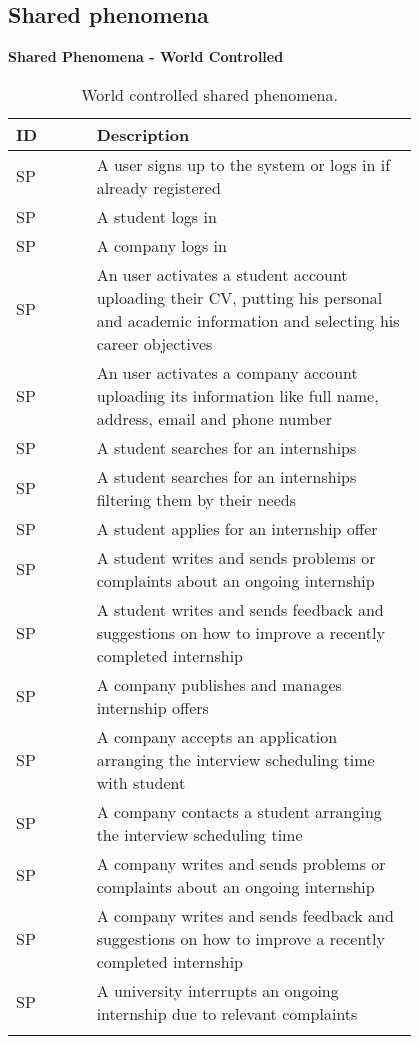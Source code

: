 \clearpage

\subsection{Shared phenomena}
\label{subsec:shared_phenomena}%
\setcounter{sp}{1}
\newcommand{\csp} {\thesp\stepcounter{sp}}
\begin{center}
\renewcommand{\arraystretch}{2}

\textbf{Shared Phenomena - World Controlled}

\begin{longtable}{ l p{0.8\linewidth} }
    \hline
    \textbf{ID} & \textbf{Description} \\ 
    \hline
    SP\csp & A user signs up to the system or logs in if already registered \\ 
    \hline
    SP\csp & A student logs in \\ 
    \hline
    SP\csp & A company logs in \\ 
    \hline
    SP\csp & An user activates a student account uploading their CV, putting his personal and academic information and selecting his career objectives \\ 
    \hline
    SP\csp & An user activates a company account uploading its information like full name, address, email and phone number \\ 
    \hline
    SP\csp & A student searches for an internships \\
    \hline
    SP\csp & A student searches for an internships filtering them by their needs \\ 
    \hline
    SP\csp & A student applies for an internship offer \\ 
    \hline
    SP\csp & A student writes and sends problems or complaints about an ongoing internship \\ 
    \hline
    SP\csp & A student writes and sends feedback and suggestions on how to improve a recently completed internship \\ 
    \hline
    SP\csp & A company publishes and manages internship offers \\ 
    \hline
    SP\csp & A company accepts an application arranging the interview scheduling time with student \\ 
    \hline
    SP\csp & A company contacts a student arranging the interview scheduling time \\ 
    \hline
    SP\csp & A company writes and sends problems or complaints about an ongoing internship \\ 
    \hline
    SP\csp & A company writes and sends feedback and suggestions on how to improve a recently completed internship \\ 
    \hline
    SP\csp & A university interrupts an ongoing internship due to relevant complaints \\ 
    \hline
    \caption{World controlled shared phenomena.}
    \label{tab:sharedph_world_tab}%
\end{longtable}


\end{center}
